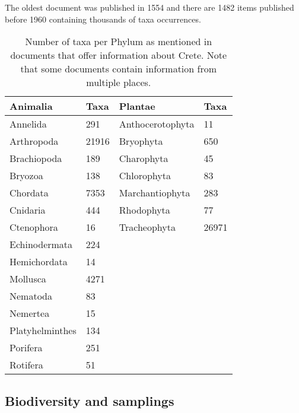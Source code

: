 The oldest document was published in 1554 and there are 1482 items published before 1960 containing thousands of taxa occurrences.

\begin{longtable}{llll}
    \caption{Number of taxa per Phylum as mentioned in documents that offer information about Crete. Note that some documents contain information from multiple places. \label{table:crete_bhl_phyla}} \\
\textbf{Animalia} & \textbf{Taxa} & \textbf{Plantae} & \textbf{Taxa} \\
\endfirsthead
%
\endhead
%
Annelida          & 291           & Anthocerotophyta & 11            \\
Arthropoda        & 21916         & Bryophyta        & 650           \\
Brachiopoda       & 189           & Charophyta       & 45            \\
Bryozoa           & 138           & Chlorophyta      & 83            \\
Chordata          & 7353          & Marchantiophyta  & 283           \\
Cnidaria          & 444           & Rhodophyta       & 77            \\
Ctenophora        & 16            & Tracheophyta     & 26971         \\
Echinodermata     & 224           &                  &               \\
Hemichordata      & 14            &                  &               \\
Mollusca          & 4271          &                  &               \\
Nematoda          & 83            &                  &               \\
Nemertea          & 15            &                  &               \\
Platyhelminthes   & 134           &                  &               \\
Porifera          & 251           &                  &               \\
Rotifera          & 51            &                  &              
\end{longtable}

\subsection{Biodiversity and samplings}

